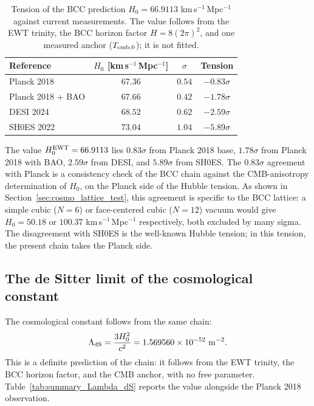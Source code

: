 \documentclass[10pt,a4paper]{article}
\begin{document}
\begin{table}[h]
	\centering
	\small
	\caption{Tension of the BCC prediction \(H_0 = 66.9113\)
		km\,s\(^{-1}\)\,Mpc\(^{-1}\) against current measurements. The
		value follows from the EWT trinity, the BCC horizon factor
		\(H = 8(2\pi)^2\), and one measured anchor (\(T_{\rm cmb,0}\)); it
		is not fitted.}
	\label{tab:summary_tension_H0}
	\begin{tabular}{lccc}
		\toprule
		\textbf{Reference} & \(H_0\) [km\,s\(^{-1}\)\,Mpc\(^{-1}\)] & \(\sigma\) & \textbf{Tension} \\
		\midrule
		Planck 2018 \cite{Planck2018} & \(67.36\) & \(0.54\) & \(-0.83\sigma\) \\
		Planck 2018 + BAO             & \(67.66\) & \(0.42\) & \(-1.78\sigma\) \\
		DESI 2024 \cite{DESI2024}     & \(68.52\) & \(0.62\) & \(-2.59\sigma\) \\
		SH0ES 2022 \cite{SH0ES2022}   & \(73.04\) & \(1.04\) & \(-5.89\sigma\) \\
		\bottomrule
	\end{tabular}
\end{table}

The value \(H_0^{\rm EWT} = 66.9113\) lies \(0.83\sigma\) from Planck
2018 base, $1.78\sigma$ from Planck 2018 with BAO, \(2.59\sigma\) from
DESI, and \(5.89\sigma\) from SH0ES. The
\(0.83\sigma\) agreement with Planck is a consistency check of the
BCC chain against the CMB-anisotropy determination of \(H_0\), on the
Planck side of the Hubble tension. As shown in
Section~\ref{sec:cosmo_lattice_test}, this agreement is specific to
the BCC lattice: a simple cubic (\(N=6\)) or face-centered cubic
(\(N=12\)) vacuum would give \(H_0 = 50.18\) or \(100.37\)
km\,s\(^{-1}\)\,Mpc\(^{-1}\) respectively, both excluded by many
sigma. The disagreement with SH0ES is the well-known Hubble tension;
in this tension, the present chain takes the Planck side.

\subsection{The de Sitter limit of the cosmological constant}
\label{sec:summary_Lambda}

The cosmological constant follows from the same chain:
\begin{equation}
	\Lambda_{\rm dS} = \frac{3 H_0^2}{c^2}
	= 1.569560\times 10^{-52}\ {\rm m^{-2}}.
	\label{eq:summary_Lambda_dS}
\end{equation}
This is a definite prediction of the chain: it follows from the EWT
trinity, the BCC horizon factor, and the CMB anchor, with no free
parameter. Table~\ref{tab:summary_Lambda_dS} reports the value
alongside the Planck 2018 observation.
\end{document}
